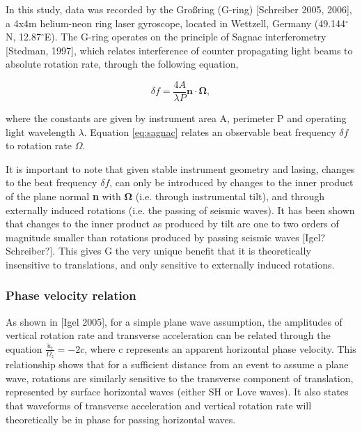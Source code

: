 \documentclass{gji}
\begin{document}
In this study, data was recorded by the Gro\ss ring (G-ring) [Schreiber 2005, 2006], a 4x4m helium-neon ring laser gyroscope, located in Wettzell, Germany (49.144$^\circ$N, 12.87$^\circ$E). The G-ring operates on the principle of Sagnac interferometry [Stedman, 1997], which relates interference of counter propagating light beams to absolute rotation rate, through the following equation, 

\begin{equation}\label{eq:sagnac}
	\delta f = \frac{4A}{\lambda P}\mathbf{n}\cdot \mathbf{\Omega},
\end{equation}

\noindent where the constants are given by instrument area A, perimeter P and operating light wavelength $\lambda$. Equation \ref{eq:sagnac} relates an observable beat frequency $\delta f$ to rotation rate $\Omega$.

It is important to note that given stable instrument geometry and lasing, changes to the beat frequency $\delta f$, can only be introduced by changes to the inner product of the plane normal {\bfseries n} with $\mathbf{\Omega}$ (i.e. through instrumental tilt), and through externally induced rotations (i.e. the passing of seismic waves). It has been shown that changes to the inner product as produced by tilt are one to two orders of magnitude smaller than rotations produced by passing seismic waves [Igel? Schreiber?]. This gives G the very unique benefit that it is theoretically insensitive to translations, and only sensitive to externally induced rotations.

\subsubsection{Phase velocity relation}\label{phasevel}
As shown in [Igel 2005], %
for a simple plane wave assumption, the amplitudes of vertical rotation rate and transverse acceleration can be related through the equation $\frac{\ddot{u}_t}{\Omega_z} = -2c$, where c represents an apparent horizontal phase velocity. This relationship shows that for a sufficient distance from an event to assume a plane wave, rotations are similarly sensitive to the transverse component of translation, represented by surface horizontal waves (either SH or Love waves). It also states that waveforms of transverse acceleration and vertical rotation rate will theoretically be in phase for passing horizontal waves.
\end{document}
